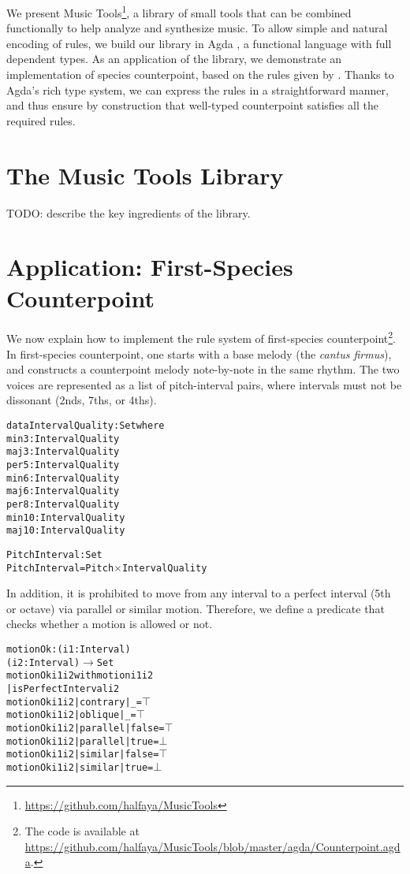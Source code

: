 \documentclass[sigplan,10pt,screen]{acmart}
\begin{document}
We present Music Tools\footnote{\url{https://github.com/halfaya/MusicTools}},
a library of small tools that can be combined functionally to 
help analyze and synthesize music.
To allow simple and natural encoding of rules, we build our 
library in Agda \citep{norellphd}, a functional language with full dependent types.
As an application of the library, we demonstrate an
implementation  of species counterpoint, based on the rules 
given by \citet{fux1965study}.
Thanks to Agda's rich type system, we can express 
the rules in a straightforward manner, and thus ensure by 
construction that well-typed counterpoint satisfies all the 
required rules.


\section{The Music Tools Library}

TODO: describe the key ingredients of the library.


\section{Application: First-Species Counterpoint}

We now explain how to implement the rule system of 
first-species counterpoint\footnote{The code is available at \\
\url{https://github.com/halfaya/MusicTools/blob/master/agda/Counterpoint.agda}.}.
In first-species counterpoint, one starts with a base melody 
(the \emph{cantus firmus}), and constructs a counterpoint 
melody note-by-note in the same rhythm.
The two voices are represented as a list of pitch-interval pairs,
where intervals must not be dissonant (2nds, 7ths, or 4ths).

\begin{alltt}
data IntervalQuality : Set where
  min3  : IntervalQuality
  maj3  : IntervalQuality
  per5  : IntervalQuality
  min6  : IntervalQuality
  maj6  : IntervalQuality
  per8  : IntervalQuality
  min10 : IntervalQuality
  maj10 : IntervalQuality

PitchInterval : Set
PitchInterval = Pitch \(\times\) IntervalQuality
\end{alltt}

In addition, it is prohibited to move from any interval to
a perfect interval (5th or octave) via parallel or similar motion.
Therefore, we define a predicate that checks whether a motion 
is allowed or not.

\begin{alltt}
motionOk : (i1 : Interval)
           (i2 : Interval) \(\rightarrow\) Set
motionOk i1 i2 with motion i1 i2
         | isPerfectInterval i2
motionOk i1 i2 | contrary | \_     = \(\top\)
motionOk i1 i2 | oblique  | \_     = \(\top\)
motionOk i1 i2 | parallel | false = \(\top\)
motionOk i1 i2 | parallel | true  = \(\bot\)
motionOk i1 i2 | similar  | false = \(\top\)
motionOk i1 i2 | similar  | true  = \(\bot\)
\end{alltt}
\end{document}
